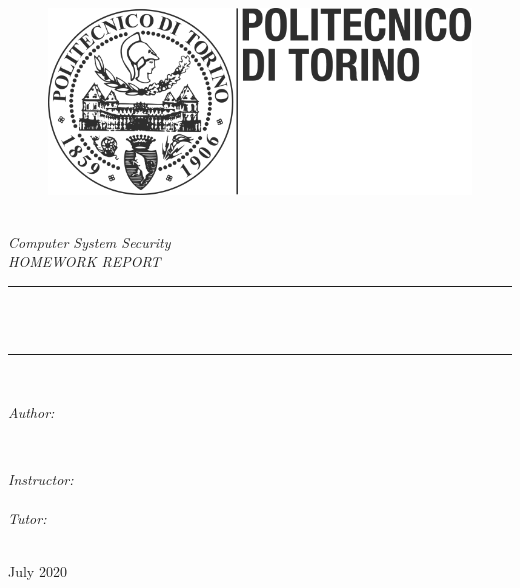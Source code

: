\begin{titlepage}
\newcommand{\HRule}{\rule{\linewidth}{0.5mm}}

\begin{figure}[!htb]
   \begin{minipage}{\textwidth}
     \centering
     \includegraphics[width=.3\linewidth]{title/polito_logo.png}
   \end{minipage}\hfill
   
\end{figure}

\center 
\quad\\[1.5cm]

\textsl{\Large Computer System Security}\\[1.5cm] 
\textsl{\large HOMEWORK REPORT}\\[1.5cm] 
\makeatletter
\HRule \\[0.5cm]
{ \huge \bfseries \@title}\\[0.5cm] 
\HRule \\[1.5cm]
\begin{minipage}{0.4\textwidth}
\begin{flushleft} \large
\emph{Author:}\\
\textup{\@author} 
\end{flushleft}
\end{minipage}
~
\begin{minipage}{0.4\textwidth}
\begin{flushright} \large
\emph{Instructor:} \\
\textup{\instructor} \\
\vspace{1cm}
\emph{Tutor:} \\
\textup{\supervisor}
\end{flushright}
\end{minipage}\\[3cm]
\makeatother
\vspace{3cm}
{\large {July 2020}}\\[2cm] 
\vfill 
\end{titlepage}